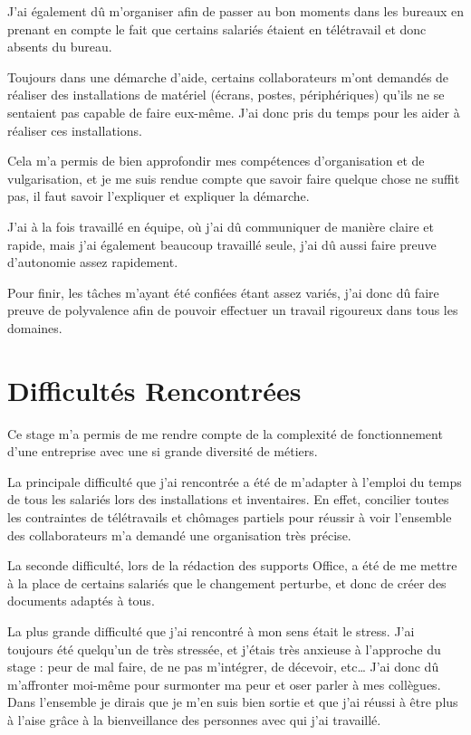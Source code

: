 J'ai également dû m'organiser afin de passer au bon moments dans les bureaux en prenant en compte le fait que certains salariés étaient en télétravail et donc absents du bureau.

Toujours dans une démarche d'aide, certains collaborateurs m'ont demandés de réaliser des installations de matériel (écrans, postes, périphériques) qu'ils ne se sentaient pas capable de faire eux-même. J'ai donc pris du temps pour les aider à réaliser ces installations.

Cela m'a permis de bien approfondir mes compétences d'organisation et de vulgarisation, et je me suis rendue compte que savoir faire quelque chose ne suffit pas, il faut savoir l'expliquer et expliquer la démarche.

J'ai à la fois travaillé en équipe, où j'ai dû communiquer de manière claire et rapide, mais j'ai également beaucoup travaillé seule, j'ai dû aussi faire preuve d'autonomie assez rapidement.

Pour finir, les tâches m’ayant été confiées étant assez variés, j’ai donc dû faire preuve de polyvalence afin de pouvoir effectuer un travail rigoureux dans tous les domaines.

\section{Difficultés Rencontrées}

Ce stage m'a permis de me rendre compte de la complexité de fonctionnement d'une entreprise avec une si grande diversité de métiers.

La principale difficulté que j'ai rencontrée a été de m'adapter à l'emploi du temps de tous les salariés lors des installations et inventaires.
En effet, concilier toutes les contraintes de télétravails et chômages partiels pour réussir à voir l'ensemble des collaborateurs m'a demandé une organisation très précise.

La seconde difficulté, lors de la rédaction des supports Office, a été de me mettre à la place de certains salariés que le changement perturbe, et donc de créer des documents adaptés à tous.

La plus grande difficulté que j’ai rencontré à mon sens était le stress. J’ai toujours été quelqu’un de très stressée, et j’étais très anxieuse à l’approche du stage : peur de mal faire, de ne pas m’intégrer, de décevoir, etc\dots
J’ai donc dû m’affronter moi-même pour surmonter ma peur et oser parler à mes collègues. Dans l’ensemble je dirais que je m’en suis bien sortie et que j’ai réussi à être plus à l’aise grâce à la bienveillance des personnes avec qui j’ai travaillé.

